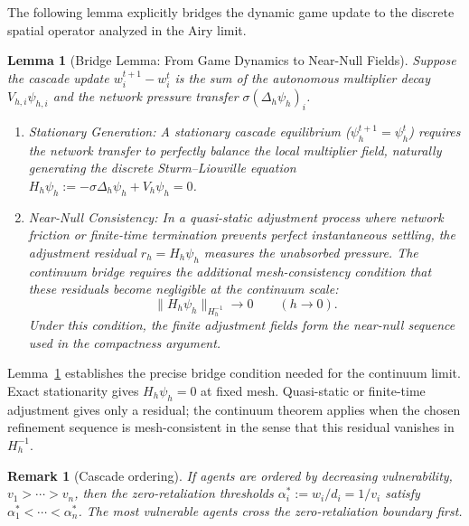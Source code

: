 \documentclass[review,authoryear]{elsarticle}
\newtheorem{lemma}{Lemma}
\newtheorem{remark}{Remark}
\theoremstyle{definition}
\theoremstyle{plain}
\begin{document}
The following lemma explicitly bridges the dynamic game update to the discrete spatial operator analyzed in the Airy limit.

\begin{lemma}[Bridge Lemma: From Game Dynamics to Near-Null Fields]
\label{lem:bridge-cascade}
Suppose the cascade update $w_i^{t+1} - w_i^t$ is the sum of the autonomous multiplier decay $V_{h,i}\psi_{h,i}$ and the network pressure transfer $\sigma(\Delta_h\psi_h)_i$.
\begin{enumerate}
    \item \emph{Stationary Generation:} A stationary cascade equilibrium ($\psi_{h}^{t+1} = \psi_{h}^t$) requires the network transfer to perfectly balance the local multiplier field, naturally generating the discrete Sturm--Liouville equation $H_h\psi_h := -\sigma\Delta_h\psi_h + V_h\psi_h = 0$.
    \item \emph{Near-Null Consistency:} In a quasi-static adjustment process where network friction or finite-time termination prevents perfect instantaneous settling, the adjustment residual $r_h = H_h\psi_h$ measures the unabsorbed pressure. The continuum bridge requires the additional mesh-consistency condition that these residuals become negligible at the continuum scale:
    \[
    \|H_h\psi_h\|_{H_h^{-1}}\to0
    \qquad (h\to0).
    \]
    Under this condition, the finite adjustment fields form the near-null sequence used in the compactness argument.
\end{enumerate}
\end{lemma}

Lemma~\ref{lem:bridge-cascade} establishes the precise bridge condition needed for the continuum limit.  Exact stationarity gives $H_h\psi_h=0$ at fixed mesh.  Quasi-static or finite-time adjustment gives only a residual; the continuum theorem applies when the chosen refinement sequence is mesh-consistent in the sense that this residual vanishes in $H_h^{-1}$.

\begin{remark}[Cascade ordering]
\label{rem:cascade-ordering}
If agents are ordered by decreasing vulnerability, $v_1>\cdots>v_n$, then the zero-retaliation thresholds $\alpha_i^\ast:=w_i/d_i=1/v_i$ satisfy $\alpha_1^\ast<\cdots<\alpha_n^\ast$.  The most vulnerable agents cross the zero-retaliation boundary first.
\end{remark}
\end{document}
